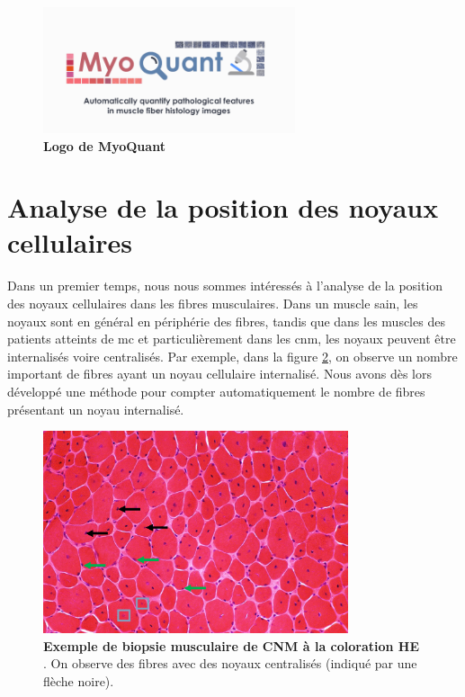 \begin{figure}[!ht]
 \centering
 \includegraphics[width=0.66\textwidth]{figures/myoquant_logo.png}
 \caption[Logo MyoQuant]{\textbf{Logo de MyoQuant}}
 \label{fig:myoquant_logo}
\end{figure}

\section{Analyse de la position des noyaux cellulaires}
Dans un premier temps, nous nous sommes intéressés à l'analyse de la position des noyaux cellulaires dans les fibres musculaires. Dans un muscle sain, les noyaux sont en général en périphérie des fibres, tandis que dans les muscles des patients atteints de \gls{mc} et particulièrement dans les \gls{cnm}, les noyaux peuvent être internalisés voire centralisés. Par exemple, dans la figure \ref{fig:he_example}, on observe un nombre important de fibres ayant un noyau cellulaire internalisé. Nous avons dès lors développé une méthode pour compter automatiquement le nombre de fibres présentant un noyau internalisé.
\begin{figure}[!ht]
 \centering
 \includegraphics[width=0.8\textwidth]{figures/he_example.jpg}
 \caption[Exemple de biopsie musculaire à la coloration HE]{\textbf{Exemple de biopsie musculaire de CNM à la coloration HE }. On observe des fibres avec des noyaux centralisés (indiqué par une flèche noire).}
 \label{fig:he_example}
\end{figure}

